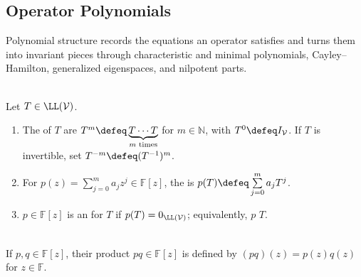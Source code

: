 \subsection{Operator Polynomials}

%

Polynomial structure records the equations an operator satisfies and turns them into invariant pieces through characteristic and minimal polynomials, Cayley--Hamilton, generalized eigenspaces, and nilpotent parts.

\begin{definition} \label{def:operator-powers} \label{def:polynomial-applied-to-operator} \label{def:annihilating-polynomial} \\
Let $T\in\LL(\mathcal{V})$.
\begin{enumerate}[label=(\roman*)]
\setlength{\itemsep}{0pt}
\item The  of $T$ are $T^m\defeq\underbrace{T\cdots T}_{m\text{ times}}$ for $m\in\mathbb{N}$, with $T^0\defeq I_{\mathcal{V}}$. If $T$ is invertible, set $T^{-m}\defeq(T^{-1})^m$.
\item For $p(z)=\sum\limits_{j=0}^{m}a_jz^j\in\mathbb{F}[z]$, the  is $p(T)\defeq\sum\limits_{j=0}^{m}a_jT^j$.
\item $p\in\mathbb{F}[z]$ is an  for $T$ if $p(T)=0_{\LL(\mathcal{V})}$; equivalently, $p$  $T$.
\end{enumerate}
\end{definition}

\begin{definition} \label{def:product-of-polynomials} \\
If $p,q\in\mathbb{F}[z]$, their product $pq\in\mathbb{F}[z]$ is defined by $(pq)(z)=p(z)q(z)$ for $z\in\mathbb{F}$.
\end{definition}

